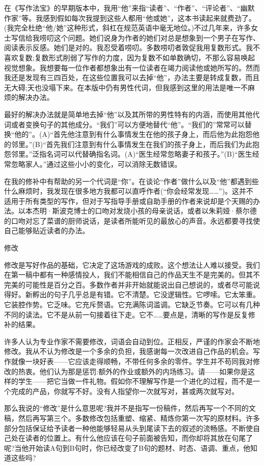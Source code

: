 在《写作法宝》的早期版本中，我用“他”来指“读者”、“作者”、“评论者”、“幽默作家”等。我感到假如每次我提到这些人都用“他或她”，这本书读起来就费劲了。(我完全杜绝“他/她”这种形式，斜杠在规范英语中毫无地位。)不过几年来，许多女士写信给我唠叨这个问题。她们说身为作者的她们对总是想象到一个男子在写作、阅读表示反感。她们是对的。我忍受着唠叨。多数唠叨者敦促我用复数形式。我不喜欢复数;复数形式削弱了写作的力度，因为复数不如单数确切，不那么容易唤起视觉想象。我想要每一位作者都想象出有一位读者在竭力阅读他或她所写的。然而我还是发现有三四百处，在这些位置我可以去掉“他”，办法主要是转成复数，而且无大碍;天也没塌下来。在本版中仍有男性代词，但我感到这里的用法是唯一不麻烦的解决办法。

最好的解决办法就是简单地去掉“他”以及其所带的男性特有的内涵，而使用其他代词或者变换句子的其他成分。“我们”可以方便地替代“他”。“我们的”常常可以替换“他的”。(A)“首先他注意到有什么事情发生在他的孩子身上，而后他为此抱怨他的邻里。”(B)“首先我们注意到有什么事情发生在我们的孩子身上，而后我们为此抱怨邻里。”泛指名词可以代替确指名词。(A)“医生经常忽略妻子和孩子。”(B)“医生经常忽略家人。”通过这些小小的变化，可以消除无数错误。

在我的修补中有帮助的另一个代词是“你”。在谈论“作者”做什么以及“他”都遇到些什么麻烦时，我发现在很多地方我都可以直呼作者(“你会经常发现……”)。这并不适用于所有类型的写作，但对于写指导手册或自助手册的作者来说却是个天赐的办法。以本杰明·斯波克博士的口吻对发烧小孩的母亲说话，或者以朱莉娅·蔡尔德的口吻对忘了菜谱的厨师说话，是读者所能听见的最放心的声音。永远都要寻找使自己能够贴近读者的办法。

修改

修改是写好作品的基础，它决定了这场游戏的成败。这个想法让人难以接受。我们在第一稿中都有一种感情投人，我们不能相信自己的作品天生不是完美的。但其不完美的可能性是百分之百。多数作者并非开始就能说出自己想说的，或者尽可能说得好。新孵出的句子几乎总是有错。它不清楚。它没逻辑性。它啰嗦。它太笨重。它装腔作势。它乏味。它充斥赘语。它充满陈词滥调。它缺乏节奏。它可以有几种不同的读法。它不是从前一句接着往下走。它不……要点是，清晰的写作是反复修补的结果。

许多人认为专业作家不需要修改，词语会自动到位。正相反，严谨的作家会不断地修改。我从不认为修改是一个多余的负担，我感谢每一次改进自己作品的机会。写作就像一块好表——它应该走得顺畅，不带任何多余的零件。学生并不苟同我对修改的热衷。他们认为那是惩罚:额外的作业或额外的内场练习。请——如果你是这样的学生——把它当做一件礼物。假如你不理解写作是一个进化的过程，而不是一个完成的产品，你就写不好。没有人指望你一次就写对，甚或两次就写对。

那么我说的“修改”是什么意思呢?我并不是指写一份稿件，然后再写一个不同的文稿，然后再写第三个。多数修改包括重塑、缩紧、精炼你第一次写的原材料。许多部分包括保证给予读者一种他能够轻易从头到尾读下去的叙述的流畅感。不断使自己处在读者的位置上。有什么他应该在句子前面被告知，而你却将其放在句尾了呢?当他开始读A句到B句时，你已经改变了B句的题材、时态、语调、重点，他知道这些吗?

